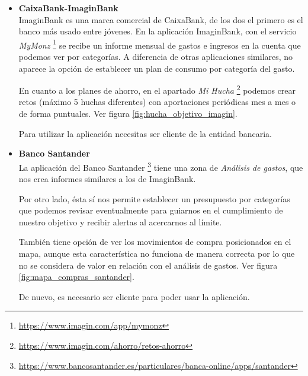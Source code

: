 \begin{itemize}

    \item \textbf{CaixaBank-ImaginBank} \\
    ImaginBank es una marca comercial de CaixaBank, de los dos el primero es el banco más usado entre jóvenes. 
    En la aplicación ImaginBank, con el servicio \textit{MyMonz} \footnote{\url{https://www.imagin.com/app/mymonz}}
    se recibe un informe mensual de gastos e ingresos en la cuenta que podemos ver por categorías. 
    A diferencia de otras aplicaciones similares, no aparece la opción de 
    establecer un plan de consumo por categoría del gasto.

    En cuanto a los planes de ahorro, en el apartado \textit{Mi Hucha} 
    \footnote{\url{https://www.imagin.com/ahorro/retos-ahorro}} podemos crear 
    retos (máximo 5 huchas diferentes) con aportaciones periódicas mes a mes 
    o de forma puntuales. Ver figura \ref{fig:hucha_objetivo_imagin}.

    Para utilizar la aplicación necesitas ser cliente de la entidad bancaria.

    \item \textbf{Banco Santander}\\
    La aplicación del Banco Santander \footnote{\url{https://www.bancosantander.es/particulares/banca-online/apps/santander}}
    tiene una zona de \textit{Análisis de gastos}, que nos crea informes similares a los de ImaginBank. 

    Por otro lado, ésta sí nos permite establecer un 
    presupuesto por categorías que podemos revisar eventualmente para guiarnos en el 
    cumplimiento de nuestro objetivo y recibir alertas al acercarnos al límite.

    También tiene opción de ver los movimientos de compra posicionados en el mapa, 
    aunque esta característica no funciona de manera correcta por lo que no se considera 
    de valor en relación con el análisis de gastos. 
    Ver figura \ref{fig:mapa_compras_santander}.

    De nuevo, es necesario ser cliente para poder usar la aplicación.\\


\end{itemize}

